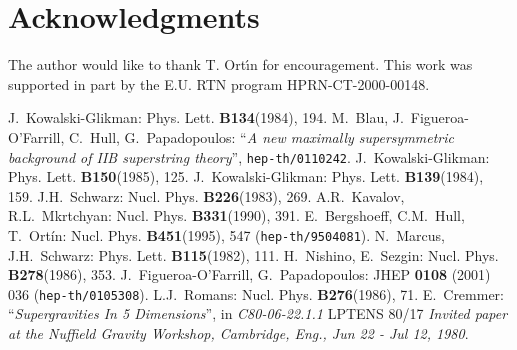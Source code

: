 \documentclass[a4paper,12pt]{article}
\begin{document}
\section*{Acknowledgments}
The author would like to thank T. Ort\'{\i}n for encouragement.
This work was supported in part by the E.U. RTN program HPRN-CT-2000-00148.
%
%
\begin{thebibliography}{2}
%
 J.~Kowalski-Glikman:
Phys. Lett. {\bf B134}(1984), 194.
%
 M.~Blau, J.~Figueroa-O'Farrill, C.~Hull, G.~Papadopoulos:
``{\em A new maximally supersymmetric background of IIB superstring theory}'',
{\tt hep-th/0110242}.
%
 J.~Kowalski-Glikman:
Phys. Lett. {\bf B150}(1985), 125.
%
 J.~Kowalski-Glikman:
Phys. Lett. {\bf B139}(1984), 159.
%
 J.H.~Schwarz:
Nucl. Phys. {\bf B226}(1983), 269.
%
 A.R.~Kavalov, R.L.~Mkrtchyan:
Nucl. Phys. {\bf B331}(1990), 391.
%
 E.~Bergshoeff, C.M.~Hull, T.~Ort\'{i}n:
Nucl. Phys. {\bf B451}(1995), 547 ({\tt hep-th/9504081}).
%
 N.~Marcus, J.H.~Schwarz:
Phys. Lett. {\bf B115}(1982), 111.
%
 H.~Nishino, E.~Sezgin:
Nucl. Phys. {\bf B278}(1986), 353.
%
 J.~Figueroa-O'Farrill, G.~Papadopoulos:
JHEP {\bf 0108} (2001) 036 ({\tt hep-th/0105308}).
%
 L.J.~Romans:
Nucl. Phys. {\bf B276}(1986), 71.
%
 E.~Cremmer:
``{\em Supergravities In 5 Dimensions}'',
in {\it C80-06-22.1.1} LPTENS 80/17
{\it Invited paper at the Nuffield Gravity Workshop, Cambridge, Eng., Jun 22 - Jul 12, 1980}.
%
\end{thebibliography}
%
%
\end{document}
